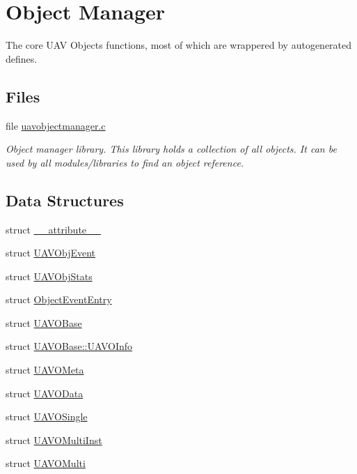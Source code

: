 \hypertarget{group___u_a_v}{\section{Object Manager}
\label{group___u_a_v}
}


The core U\-A\-V Objects functions, most of which are wrappered by autogenerated defines.  


\subsection*{Files}
\begin{DoxyCompactItemize}
\item 
file \hyperlink{uavobjectmanager_8c}{uavobjectmanager.\-c}
\begin{DoxyCompactList}\small\item\em Object manager library. This library holds a collection of all objects. It can be used by all modules/libraries to find an object reference. \end{DoxyCompactList}\end{DoxyCompactItemize}
\subsection*{Data Structures}
\begin{DoxyCompactItemize}
\item 
struct \hyperlink{struct____attribute____}{\-\_\-\-\_\-attribute\-\_\-\-\_\-}
\item 
struct \hyperlink{struct_u_a_v_obj_event}{U\-A\-V\-Obj\-Event}
\item 
struct \hyperlink{struct_u_a_v_obj_stats}{U\-A\-V\-Obj\-Stats}
\item 
struct \hyperlink{struct_object_event_entry}{Object\-Event\-Entry}
\item 
struct \hyperlink{struct_u_a_v_o_base}{U\-A\-V\-O\-Base}
\item 
struct \hyperlink{struct_u_a_v_o_base_1_1_u_a_v_o_info}{U\-A\-V\-O\-Base\-::\-U\-A\-V\-O\-Info}
\item 
struct \hyperlink{struct_u_a_v_o_meta}{U\-A\-V\-O\-Meta}
\item 
struct \hyperlink{struct_u_a_v_o_data}{U\-A\-V\-O\-Data}
\item 
struct \hyperlink{struct_u_a_v_o_single}{U\-A\-V\-O\-Single}
\item 
struct \hyperlink{struct_u_a_v_o_multi_inst}{U\-A\-V\-O\-Multi\-Inst}
\item 
struct \hyperlink{struct_u_a_v_o_multi}{U\-A\-V\-O\-Multi}
\end{DoxyCompactItemize}
